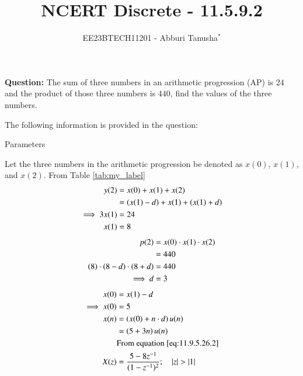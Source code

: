 \documentclass[journal,12pt,twocolumn]{IEEEtran}
\theoremstyle{remark}
\begin{document}

\vspace{3cm}

\title{NCERT Discrete - 11.5.9.2}
\author{EE23BTECH11201 - Abburi Tanusha$^{*}$%
}
\maketitle
\newpage
\bigskip

\renewcommand{\thefigure}{\theenumi}
\renewcommand{\thetable}{\theenumi}

\vspace{3cm}

\maketitle
\textbf{Question:} 
The sum of three numbers in an arithmetic progression (AP) is $24$ and the product of those three numbers is $440$, find the values of the three numbers.

\solution
The following information is provided in the question:
\begin{table}[h]
 	\centering
 	\resizebox{6 cm}{!}{
 		
 	}
 	\vspace{6 pt}
 	\caption{Parameters}
 	\label{tab:my_label} 
 \end{table}
\newline
Let the three numbers in the arithmetic progression be denoted as $x(0)$, $x(1)$, and $x(2)$.
\newline
From Table \ref{tab:my_label}
\begin{align}
  y(2) &= x(0) + x(1) + x(2) \\ 
    &= \left(x(1) - d \right) + x(1) + \left(x(1) + d\right) \\
    \implies 3x(1) &= 24 \\ 
    x(1) &= 8 
\end{align}
\begin{align}
   p(2) &= x(0) \cdot x(1) \cdot x(2)   \\
   &= 440  \\
    \left(8\right) \cdot \left(8-d\right) \cdot \left(8+d\right) &= 440  \\
  \implies d &= 3   
\end{align}
\begin{align}
     x(0) &= x(1) - d \\
     \implies x(0) &= 5  \\
    x(n) &= \left(x(0) + n \cdot d\right) u(n)  \\
         &= \left(5 + 3n\right)u(n)  \\
         &\text{From equation \eqref{eq:11.9.5.26.2}}  \\
    X(z) &= \frac{5 - 8z^{-1}}{(1-z^{-1})^2} ; \quad \left\vert z\right\vert>\left\vert1\right\vert 
\end{align}
\end{document}
